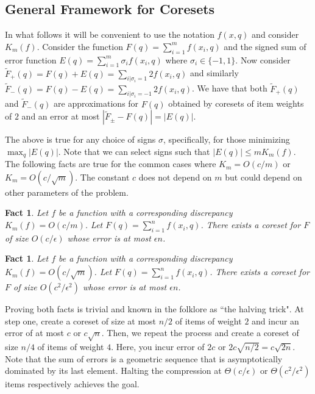 \documentclass[anon,12pt]{colt2019} %
\newtheorem{fact}[theorem]{Fact}
\newcommand{\eps}{\epsilon}
\begin{document}
\subsection{General Framework for Coresets}
In what follows it will be convenient to use the notation $f(x,q)$ and consider $K_m(f)$.
%
Consider the function $F(q) = \sum_{i=1}^{m} f(x_i,q)$ and the signed sum of error function $E(q) = \sum_{i=1}^{m} \sigma_i f(x_i,q)$ where $\sigma_i \in \{-1,1\}$.
Now consider $\tilde F_{+}(q) = F(q) + E(q)   = \sum_{i | \sigma_i=1} 2 f(x_i,q)$ and similarly $\tilde F_{-}(q) = F(q) - E(q)  =  \sum_{i | \sigma_i=-1} 2 f(x_i,q)$. We have that both $\tilde F_{+}(q)$ and $\tilde F_{-}(q)$ are approximations for $F(q)$ obtained by coresets of item weights of $2$ and an error at most $|\tilde F_{\pm}- F(q)| =  |E(q)|$.

%
The above is true for any choice of signs $\sigma$, specifically, for those minimizing $\max_q | E(q)|$.
Note that we can select signs such that $|E(q)| \le m K_m(f)$.
The following facts are true for the common cases where $K_m = O(c/m)$ or $K_m = O(c/\sqrt{m})$.
The constant $c$ does not depend on $m$ but could depend on other parameters of the problem. 

\begin{fact}
Let $f$ be a function with a corresponding discrepancy $K_m(f) = O(c/m)$. Let $F(q) = \sum_{i=1}^{n}f(x_i, q)$. There exists a coreset for $F$ of size $O(c/\eps)$ whose error is at most $\eps n$.
\end{fact}
\begin{fact}
Let $f$ be a function with a corresponding discrepancy $K_m(f) = O(c/\sqrt{m})$. Let $F(q) = \sum_{i=1}^{n}f(x_i, q)$. There exists a coreset for $F$ of size $O(c^2/\eps^2)$ whose error is at most $\eps n$.
\end{fact}

\noindent Proving both facts is trivial and known in the folklore as ``the halving trick". 
At step one, create a coreset of size at most $n/2$ of items of weight $2$ and incur an error of at most $c$ or $c \sqrt{n}$.
Then, we repeat the process and create a coreset of size $n/4$ of items of weight $4$. Here, you incur error of $2c$ or $2c\sqrt{n/2}  = c\sqrt{2n}$.
Note that the sum of errors is a geometric sequence that is asymptotically dominated by its last element. 
Halting the compression at $\Theta(c/\eps)$ or $\Theta(c^2/\eps^2)$ items respectively achieves the goal.
\end{document}
